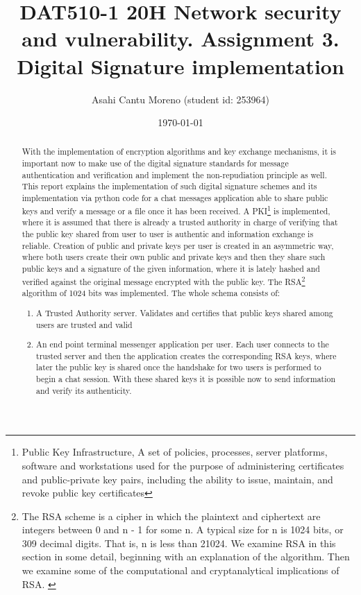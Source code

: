 \documentclass[letterpaper,12pt]{article}
\begin{document}
\title{DAT510-1 20H Network security and vulnerability. Assignment 3. Digital Signature implementation}
\author{Asahi Cantu Moreno (student id: 253964)}
\date{\today}
\maketitle

\begin{abstract}
With the implementation of encryption algorithms and key exchange mechanisms, it is important now to make use of the digital signature standards for message authentication  and verification and implement the non-repudiation principle as well. This report explains the implementation of such digital signature schemes and its implementation via python code for a chat messages application able to share public keys and verify a message or a file once it has been received. A PKI\footnote{Public Key Infrastructure, A set of policies, processes, server platforms, software and workstations used for the purpose of administering certificates and public-private key pairs, including the ability to issue, maintain, and revoke public key
certificates\cite{WS2017-PKI}} is implemented, where it is assumed that there is already a trusted authority in charge of verifying that the public key shared from user to user is authentic and information exchange is reliable. Creation of public and private keys per user is created in an asymmetric way, where both users create their own public and private keys and then they share such public keys and a signature of the given information, where it is lately hashed and verified against the original message encrypted with the public key. The RSA\footnote{The RSA scheme is a cipher in which the plaintext and ciphertext are integers
between 0 and n - 1 for some n. A typical size for n is 1024 bits, or 309 decimal
digits. That is, n is less than 21024. We examine RSA in this section in some detail,
beginning with an explanation of the algorithm. Then we examine some of the computational and cryptanalytical implications of RSA. \cite{WS2017-RSA}} algorithm of 1024 bits was implemented.  
The whole schema consists of:
\begin{enumerate}
    \item A Trusted Authority server. Validates and certifies that public keys shared among users are trusted and valid
    \item An end point terminal messenger application per user. Each user connects to the trusted server and then the application creates the corresponding RSA keys, where later the public key is shared once the handshake for two users is performed to begin a chat session. With these shared keys it is possible now to send information and verify its authenticity.
    

\end{enumerate}
\end{abstract}
\end{document}
